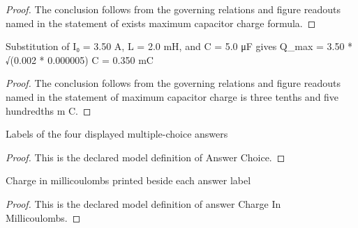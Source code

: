 \begin{proof}
  The conclusion follows from the governing relations and figure readouts named in the statement of exists maximum capacitor charge formula.
\end{proof}
\begin{lemma}
  \label{lem:physics:phyx-mini-0987:phyxminiproblems-problemphyxmini0987-maximum-capacitor-charge-is-three-tenths-and-five-hundredths-mc}
  Substitution of I₀ = 3.50 A, L = 2.0 mH, and C = 5.0 μF gives Q\_max = 3.50 * √(0.002 * 0.000005) C = 0.350 mC
\end{lemma}
\begin{proof}
  The conclusion follows from the governing relations and figure readouts named in the statement of maximum capacitor charge is three tenths and five hundredths m C.
\end{proof}
\begin{definition}
  \label{def:physics:phyx-mini-0987:phyxminiproblems-problemphyxmini0987-answerchoice}
  Labels of the four displayed multiple-choice answers
\end{definition}
\begin{proof}
  This is the declared model definition of Answer Choice.
\end{proof}
\begin{definition}
  \label{def:physics:phyx-mini-0987:phyxminiproblems-problemphyxmini0987-answerchargeinmillicoulombs}
  Charge in millicoulombs printed beside each answer label
\end{definition}
\begin{proof}
  This is the declared model definition of answer Charge In Millicoulombs.
\end{proof}
